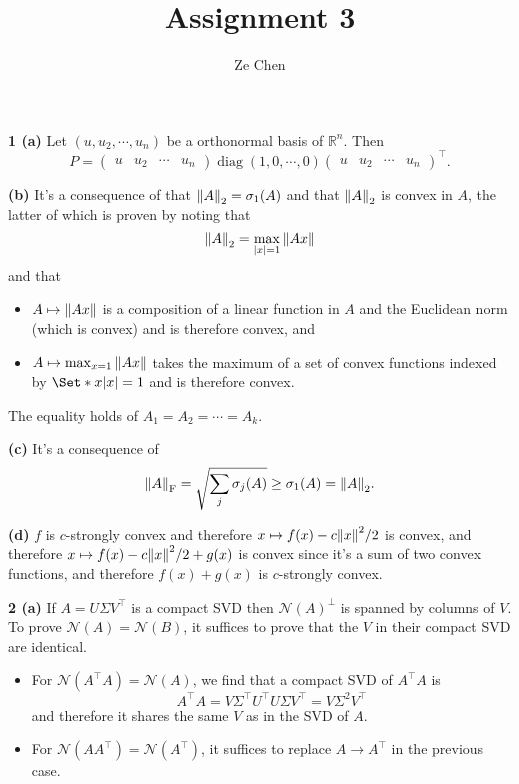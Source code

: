 \documentclass{article}
\title{Assignment 3}
\author{Ze Chen}
\makeatletter
\newcommand*{\shifttext}[1]{%
  \settowidth{\@tempdima}{#1}%
  \hspace{-\@tempdima}#1%
}
\newcommand{\plabel}[1]{%
\shifttext{\textbf{#1}\quad}%
}
\newcommand{\prule}{%
\begin{center}%
\hdashrule[0.5ex]{.99\linewidth}{1pt}{1pt 2.5pt}%
\end{center}%
}
\makeatother
\begin{document}
\maketitle

% 
% 

\plabel{1 (a)}%
Let $(u, u_2, \cdots, u_n)$ be a orthonormal basis of $\mathbb{R}^n$.
Then
\[ P = \begin{pmatrix}
    u & u_2 & \cdots & u_n
\end{pmatrix} \operatorname{diag}(1,0,\cdots,0) \begin{pmatrix}
    u & u_2 & \cdots & u_n
\end{pmatrix}^\intercal. \]

\plabel{(b)}%
It's a consequence of that $\norm{A}_2 = \sigma_1(A)$ and that $\norm{A}_2$ is convex in $A$, the latter of which is proven by noting that
\[ \norm{A}_2 = \max_{\abs{x} = 1} \norm{Ax} \]
and that
\begin{itemize}
    \item $A \mapsto \norm{Ax}$ is a composition of a linear function in $A$ and the Euclidean norm (which is convex) and is therefore convex, and
    \item $A \mapsto \max_{x=1} \norm{Ax}$ takes the maximum of a set of convex functions indexed by $\Set*{x}{\abs{x} = 1}$ and is therefore convex.
\end{itemize}
The equality holds of $A_1 = A_2 = \cdots = A_k$.

\plabel{(c)}%
It's a consequence of
\[ \norm{A}_{\mathrm{F}} = \sqrt{\sum_j \sigma_j(A)} \ge \sigma_1(A) = \norm{A}_2. \]

\plabel{(d)}%
$f$ is $c$-strongly convex and therefore $x\mapsto f(x) - c\norm{x}^2/2$ is convex, and therefore $x\mapsto f(x) - c\norm{x}^2/2 + g(x)$ is convex since it's a sum of two convex functions, and therefore $f(x) + g(x)$ is $c$-strongly convex.

\prule
\plabel{2 (a)}%
If $A = U \Sigma V^\intercal$ is a compact SVD then $\mathcal{N}(A)^\perp$ is spanned by columns of $V$.
To prove $\mathcal{N}(A) = \mathcal{N}(B)$, it suffices to prove that the $V$ in their compact SVD are identical.
\begin{itemize}
    \item For $\mathcal{N}(A^\intercal A) = \mathcal{N}(A)$, we find that a compact SVD of $A^\intercal A$ is
    \[ A^\intercal A = V \Sigma^\intercal U^\intercal U \Sigma V^\intercal = V \Sigma^2 V^\intercal \]
    and therefore it shares the same $V$ as in the SVD of $A$.
    \item For $\mathcal{N}(A A^\intercal) = \mathcal{N}(A^\intercal)$, it suffices to replace $A \rightarrow A^\intercal$ in the previous case.
\end{itemize}
\end{document}
